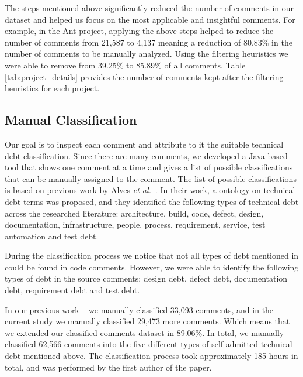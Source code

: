 The steps mentioned above significantly reduced the number of comments in our dataset and helped us focus on the most applicable and insightful comments. For example, in the Ant project, applying the above steps helped to reduce the number of comments from 21,587 to 4,137 meaning a reduction of 80.83\% in the number of comments to be manually analyzed. Using the filtering heuristics we were able to remove from 39.25\% to 85.89\% of all comments. Table \ref{tab:project_details} provides the number of comments kept after the filtering heuristics for each project.


\subsection{Manual Classification} %
\label{sub:manual_classification}

Our goal is to inspect each comment and attribute to it the suitable technical debt classification. Since there are many comments, we developed a Java based tool that shows one comment at a time and gives a list of possible classifications that can be manually assigned to the comment. The list of possible classifications is based on previous work by Alves \textit{et al.}~\cite{Alves2014MTD}. In their work, a ontology on technical debt terms was proposed, and they identified the following types of technical debt across the researched literature: architecture, build, code, defect, design, documentation, infrastructure, people, process, requirement, service, test automation and test debt. 

During the classification process we notice that not all types of debt mentioned in \cite{Alves2014MTD} could be found in code comments. However, we were able to identify the following types of debt in the source comments: design debt, defect debt, documentation debt, requirement debt and test debt.

In our previous work ~\cite{Maldonado2015MTD} we manually classified 33,093 comments, and in the current study we manually classified 29,473 more comments. Which means that we extended our classified comments dataset in 89.06\%. In total, we manually classified 62,566 comments into the five different types of self-admitted technical debt mentioned above. The classification process took approximately 185 hours in total, and was performed by the first author of the paper. 


